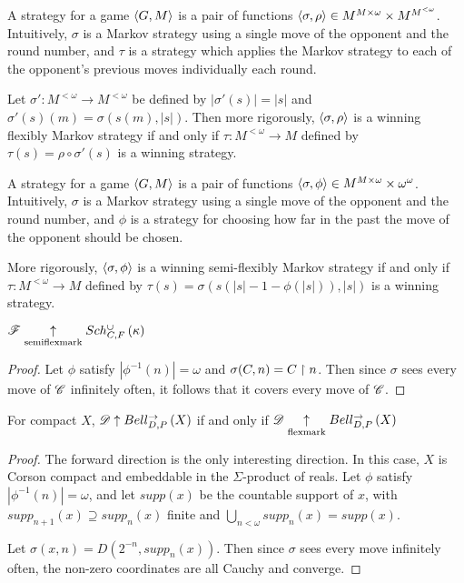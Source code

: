 \documentclass[11pt]{article}
\begin{document}
  \begin{definition}
    A  strategy for a game \(\langle G,M\rangle\)
    is a pair of functions
    \(\langle\sigma,\rho\rangle\in M^{M\times\omega}\times M^{M^{<\omega}}\).
    Intuitively, \(\sigma\) is a Markov strategy using a single move
    of the opponent and the round number, and \(\tau\) is a strategy
    which applies the Markov strategy to each of the opponent's
    previous moves individually each round.

    Let \(\sigma':M^{<\omega}\to M^{<\omega}\) be
    defined by \(|\sigma'(s)|=|s|\) and
    \(\sigma'(s)(m)=\sigma(s(m),|s|)\).
    Then more rigorously, \(\langle\sigma,\rho\rangle\)
    is a winning flexibly Markov strategy if and only if
    \(\tau:M^{<\omega}\to M\) defined by
    \(\tau(s)=\rho\circ\sigma'(s)\) is a winning strategy.
  \end{definition}

  \begin{definition}
    A  strategy for a game \(\langle G,M\rangle\)
    is a pair of functions
    \(\langle\sigma,\phi\rangle\in M^{M\times\omega}\times\omega^{\omega}\).
    Intuitively, \(\sigma\) is a Markov strategy using a single move
    of the opponent and the round number, and \(\phi\) is a strategy
    for choosing how far in the past the move of the opponent should be
    chosen.

    More rigorously, \(\langle\sigma,\phi\rangle\) is a winning semi-flexibly
    Markov strategy if and only if \(\tau:M^{<\omega}\to M\) defined
    by \(\tau(s)=\sigma(s(|s|-1-\phi(|s|)),|s|)\) is a winning
    strategy.
  \end{definition}

  \begin{proposition}
    \(\mathscr{F}\underset{\text{semiflexmark}}{\uparrow}Sch^{\cup}_{C,F}\left({\kappa}\right)\)
  \end{proposition}

  \begin{proof}
    Let \(\phi\) satisfy \(|\phi^{-1}(n)|=\omega\) and
    \(\sigma(C,n)=C\restriction n\). Then since \(\sigma\) sees every move
    of \(\mathscr{C}\) infinitely often, it follows that it covers every move
    of \(\mathscr{C}\).
  \end{proof}

  \begin{proposition}
    For compact \(X\),
    \(\mathscr{D}\uparrow Bell_{D,P}^{\to}\left({X}\right)\) if and only if
    \(\mathscr{D}\underset{\text{flexmark}}{\uparrow}Bell_{D,P}^{\to}\left({X}\right)\)
  \end{proposition}

  \begin{proof}
    The forward direction is the only interesting direction. In this case,
    \(X\) is Corson compact and embeddable in the \(\Sigma\)-product of
    reals.
    Let \(\phi\) satisfy \(|\phi^{-1}(n)|=\omega\), and let \(supp(x)\)
    be the countable support of \(x\), with
    \(supp_{n+1}(x)\supseteq supp_{n}(x)\) finite and
    \(\bigcup_{n<\omega}supp_n(x)=supp(x)\).

    Let \(\sigma(x,n)=D(2^{-n},supp_n(x))\). Then since \(\sigma\) sees
    every move infinitely often, the non-zero coordinates are all Cauchy
    and converge.
  \end{proof}
\end{document}
